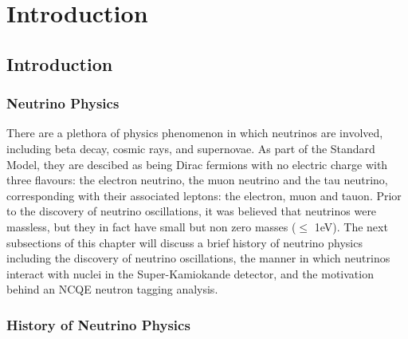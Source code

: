 \chapter{Introduction}
\label{chp:intro}

\section{Introduction}

\subsection{Neutrino Physics}

There are a plethora of physics phenomenon in which neutrinos are involved, including beta decay, cosmic rays, and supernovae. As part of the Standard Model, they are descibed as being Dirac fermions with no electric charge with three flavours: the electron neutrino, the muon neutrino and the tau neutrino, corresponding with their associated leptons: the electron, muon and tauon. Prior to the discovery of neutrino oscillations, it was believed that neutrinos were massless, but they in fact have small but non zero masses ($\le$ 1eV). The next subsections of this chapter will discuss a brief history of neutrino physics including the discovery of neutrino oscillations, the manner in which neutrinos interact with nuclei in the Super-Kamiokande detector, and the motivation behind an NCQE neutron tagging analysis.

\subsection{History of Neutrino Physics}

